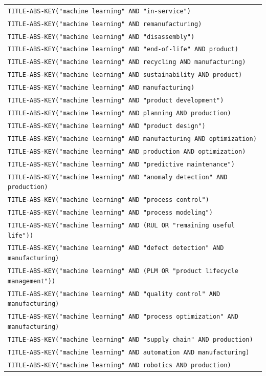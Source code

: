 \begin{longtable}{p{\textwidth}}
\texttt{TITLE-ABS-KEY("machine learning" AND "in-service")} \\
\addlinespace
\texttt{TITLE-ABS-KEY("machine learning" AND remanufacturing)} \\
\addlinespace
\texttt{TITLE-ABS-KEY("machine learning" AND "disassembly")} \\
\addlinespace
\texttt{TITLE-ABS-KEY("machine learning" AND "end-of-life" AND product)} \\
\addlinespace
\texttt{TITLE-ABS-KEY("machine learning" AND recycling AND manufacturing)} \\
\addlinespace
\texttt{TITLE-ABS-KEY("machine learning" AND sustainability AND product)} \\
\addlinespace
\texttt{TITLE-ABS-KEY("machine learning" AND manufacturing)} \\
\addlinespace
\texttt{TITLE-ABS-KEY("machine learning" AND "product development")} \\
\addlinespace
\texttt{TITLE-ABS-KEY("machine learning" AND planning AND production)} \\
\addlinespace
\texttt{TITLE-ABS-KEY("machine learning" AND "product design")} \\
\addlinespace
\texttt{TITLE-ABS-KEY("machine learning" AND manufacturing AND optimization)} \\
\addlinespace
\texttt{TITLE-ABS-KEY("machine learning" AND production AND optimization)} \\
\addlinespace
\texttt{TITLE-ABS-KEY("machine learning" AND "predictive maintenance")} \\
\addlinespace
\texttt{TITLE-ABS-KEY("machine learning" AND "anomaly detection" AND production)} \\
\addlinespace
\texttt{TITLE-ABS-KEY("machine learning" AND "process control")} \\
\addlinespace
\texttt{TITLE-ABS-KEY("machine learning" AND "process modeling")} \\
\addlinespace
\texttt{TITLE-ABS-KEY("machine learning" AND (RUL OR "remaining useful life"))} \\
\addlinespace
\texttt{TITLE-ABS-KEY("machine learning" AND "defect detection" AND manufacturing)} \\
\addlinespace
\texttt{TITLE-ABS-KEY("machine learning" AND (PLM OR "product lifecycle management"))} \\
\addlinespace
\texttt{TITLE-ABS-KEY("machine learning" AND "quality control" AND manufacturing)} \\
\addlinespace
\texttt{TITLE-ABS-KEY("machine learning" AND "process optimization" AND manufacturing)} \\
\addlinespace
\texttt{TITLE-ABS-KEY("machine learning" AND "supply chain" AND production)} \\
\addlinespace
\texttt{TITLE-ABS-KEY("machine learning" AND automation AND manufacturing)} \\
\addlinespace
\texttt{TITLE-ABS-KEY("machine learning" AND robotics AND production)} \\
\end{longtable}